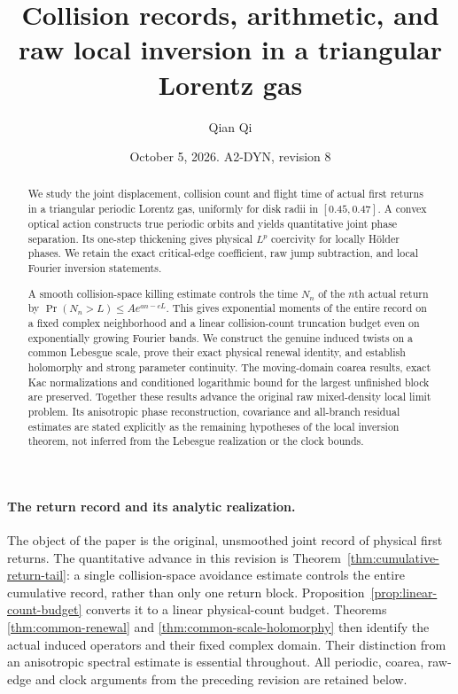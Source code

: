 \documentclass[11pt,reqno]{amsart}
\title[Collision records and raw local inversion]{Collision records, arithmetic, and raw local inversion in a triangular Lorentz gas}
\author{Qian Qi}
\date{October 5, 2026. A2-DYN, revision 8}
\numberwithin{equation}{section}
\theoremstyle{definition}\newtheorem{definition}[theorem]{Definition}
\theoremstyle{remark}\newtheorem{remark}[theorem]{Remark}
\begin{document}
\raggedbottom
\begin{abstract}
We study the joint displacement, collision count and flight time of
actual first returns in a triangular periodic Lorentz gas, uniformly
for disk radii in $[0.45,0.47]$. A convex optical action constructs true
periodic orbits and yields quantitative joint phase separation. Its
one-step thickening gives physical $L^p$ coercivity for locally
H\"older phases. We retain the exact critical-edge coefficient, raw
jump subtraction, and local Fourier inversion statements.

A smooth collision-space killing estimate controls the time $N_n$ of
the $n$th actual return by $\Pr(N_n>L)\le A e^{an-cL}$. This gives
exponential moments of the entire record on a fixed complex
neighborhood and a linear collision-count truncation budget even on
exponentially growing Fourier bands. We construct the genuine induced
twists on a common Lebesgue scale, prove their exact physical renewal
identity, and establish holomorphy and strong parameter continuity.
The moving-domain coarea results, exact Kac normalizations and
conditioned logarithmic bound for the largest unfinished block are
preserved. Together these results advance the original raw mixed-density
local limit problem. Its anisotropic phase reconstruction, covariance
and all-branch residual estimates are stated explicitly as the remaining
hypotheses of the local inversion theorem, not inferred from the
Lebesgue realization or the clock bounds.
\end{abstract}
\maketitle

\paragraph{The return record and its analytic realization.}
The object of the paper is the original, unsmoothed joint record of
physical first returns. The quantitative advance in this revision is
Theorem~\ref{thm:cumulative-return-tail}: a single collision-space
avoidance estimate controls the entire cumulative record, rather than
only one return block. Proposition~\ref{prop:linear-count-budget}
converts it to a linear physical-count budget. Theorems
\ref{thm:common-renewal} and \ref{thm:common-scale-holomorphy} then
identify the actual induced operators and their fixed complex domain.
Their distinction from an anisotropic spectral estimate is essential
throughout. All periodic, coarea, raw-edge and clock arguments from the
preceding revision are retained below.
\end{document}
